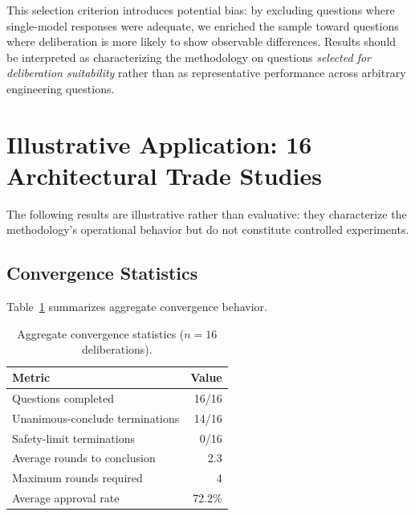 \documentclass[11pt,a4paper]{article}
\begin{document}
This selection criterion introduces potential bias: by excluding questions where single-model responses were adequate, we enriched the sample toward questions where deliberation is more likely to show observable differences. Results should be interpreted as characterizing the methodology on questions \emph{selected for deliberation suitability} rather than as representative performance across arbitrary engineering questions.

\section{Illustrative Application: 16 Architectural Trade Studies}
\label{sec:results}

The following results are illustrative rather than evaluative: they characterize the methodology's operational behavior but do not constitute controlled experiments.

\subsection{Convergence Statistics}

Table~\ref{tab:convergence} summarizes aggregate convergence behavior.

\begin{table}[ht]
\centering
\caption{Aggregate convergence statistics ($n = 16$ deliberations).}
\label{tab:convergence}
\begin{tabular}{@{}lr@{}}
\toprule
\textbf{Metric} & \textbf{Value} \\
\midrule
Questions completed & 16/16 \\
Unanimous-conclude terminations & 14/16 \\
Safety-limit terminations & 0/16 \\
Average rounds to conclusion & 2.3 \\
Maximum rounds required & 4 \\
Average approval rate & 72.2\% \\
\bottomrule
\end{tabular}
\end{table}
\end{document}
